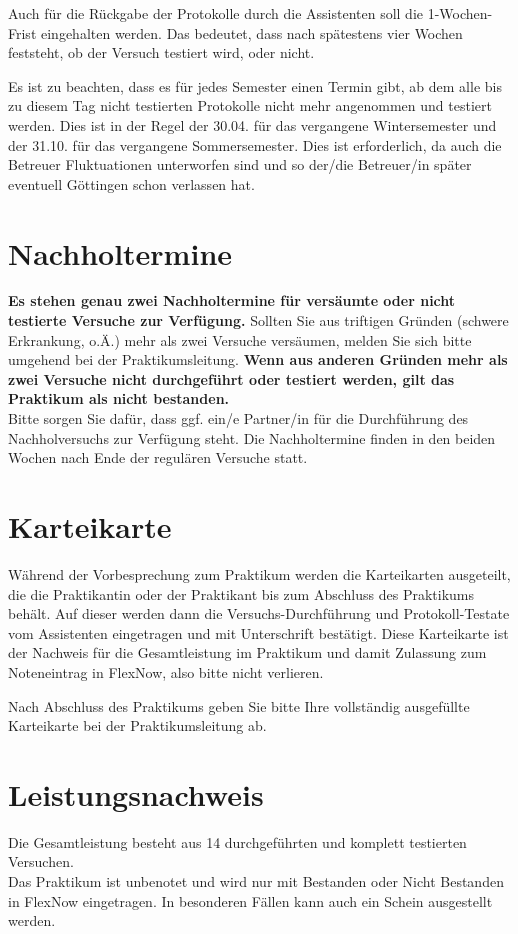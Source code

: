 Auch für die Rückgabe der Protokolle durch die Assistenten soll die 1-Wochen-Frist eingehalten werden. Das bedeutet, dass nach spätestens vier Wochen feststeht, ob der Versuch testiert wird, oder nicht.

Es ist zu beachten, dass es für jedes Semester einen Termin gibt, ab dem alle bis zu diesem Tag nicht testierten Protokolle nicht mehr angenommen und testiert werden. Dies ist in der Regel der 30.04. für das vergangene Wintersemester und der 31.10. für das vergangene Sommersemester. Dies ist erforderlich, da auch die Betreuer Fluktuationen
unterworfen sind und so der/die Betreuer/in später eventuell Göttingen schon verlassen hat.

\section{Nachholtermine}

\textbf{Es stehen genau zwei Nachholtermine für versäumte oder nicht testierte Versuche zur Verfügung.} Sollten Sie aus triftigen Gründen (schwere Erkrankung, o.Ä.) mehr als zwei Versuche versäumen, melden Sie sich bitte umgehend bei der Praktikumsleitung. \textbf{Wenn aus anderen Gründen mehr als zwei Versuche nicht durchgeführt oder testiert werden, gilt das Praktikum als nicht bestanden.}\\
Bitte sorgen Sie dafür, dass ggf. ein/e Partner/in für die Durchführung des Nachholversuchs zur Verfügung steht. Die Nachholtermine finden in den beiden Wochen nach Ende der regulären Versuche statt.


\section{Karteikarte}

Während der Vorbesprechung zum Praktikum werden die Karteikarten ausgeteilt, die die Praktikantin oder der Praktikant bis zum Abschluss des Praktikums behält. Auf dieser werden dann die Versuchs-Durchführung und Protokoll-Testate vom Assistenten eingetragen und mit Unterschrift bestätigt. Diese Karteikarte ist der Nachweis für die
Gesamtleistung im Praktikum und damit Zulassung zum Noteneintrag in FlexNow, also bitte nicht verlieren.

Nach Abschluss des Praktikums geben Sie bitte Ihre vollständig ausgefüllte Karteikarte bei der Praktikumsleitung ab.


\section{Leistungsnachweis}

Die Gesamtleistung besteht aus 14 durchgeführten und komplett testierten Versuchen. \\
Das Praktikum ist unbenotet und wird nur mit Bestanden oder Nicht Bestanden in FlexNow eingetragen. In besonderen Fällen kann auch ein Schein ausgestellt werden.
